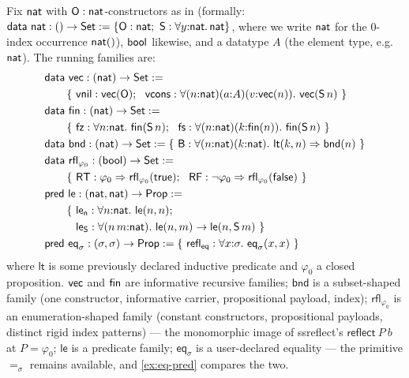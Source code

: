\begin{example}
\label{ex:declarations}
Fix $\mathsf{nat}$ with $\mathsf{O} : \mathsf{nat}$-constructors as in \cite{Extraction2026}
(formally: $\mathsf{data}\ \mathsf{nat} : () \to \mathsf{Set} \mathrel{:=} \{\mathsf{O} : \mathsf{nat};\
\mathsf{S} : \forall y{:}\mathsf{nat}.\,\mathsf{nat}\}$, where we write $\mathsf{nat}$ for the
$0$-index occurrence $\mathsf{nat}()$), $\mathsf{bool}$ likewise, and a datatype $A$
(the element type, e.g.\ $\mathsf{nat}$).  The running families are:
\begin{align*}
  &\mathsf{data}\ \vect : (\nat) \to \Set \defeq\\
  &\qquad \{\ \csvnil : \vect(\csO);\ \
    \csvcons : \forall (n{:}\nat)(a{:}A)(v{:}\vect(n)).\ \vect(\csS\,n)
    \ \}\\
  &\mathsf{data}\ \Fin : (\nat) \to \Set \defeq\\
  &\qquad \{\ \wcns{fz} : \forall n{:}\nat.\ \Fin(\csS\,n);\ \
    \wcns{fs} : \forall (n{:}\nat)(k{:}\Fin(n)).\ \Fin(\csS\,n)\ \}\\
  &\mathsf{data}\ \mathsf{bnd} : (\nat) \to \Set \defeq
    \{\ \wcns{B} : \forall (n{:}\nat)(k{:}\nat).\
      \mathsf{lt}(k, n) \Rightarrow \mathsf{bnd}(n)\ \}\\
  &\mathsf{data}\ \mathsf{rfl}_{\varphi_0} : (\bool) \to \Set \defeq\\
  &\qquad \{\ \wcns{RT} : \varphi_0 \Rightarrow
    \mathsf{rfl}_{\varphi_0}(\cstrue);\ \
    \wcns{RF} : \neg\varphi_0 \Rightarrow
    \mathsf{rfl}_{\varphi_0}(\csfalse)\ \}\\
  &\mathsf{pred}\ \mathsf{le} : (\nat, \nat) \to \Prop \defeq\\
  &\qquad \{\ \wcns{le_n} : \forall n{:}\nat.\ \mathsf{le}(n,n);\\
  &\qquad\phantom{\{}\ \wcns{le_S} : \forall (n\,m{:}\nat).\
      \mathsf{le}(n,m) \to \mathsf{le}(n, \csS\,m)\ \}\\
  &\mathsf{pred}\ \mathsf{eq}_\sigma : (\sigma, \sigma) \to \Prop \defeq
    \{\ \wcns{refl}_{\mathsf{eq}} : \forall x{:}\sigma.\
      \mathsf{eq}_\sigma(x,x)\ \}
\end{align*}
where $\mathsf{lt}$ is some previously declared inductive predicate and
$\varphi_0$ a closed proposition.  $\mathsf{vec}$ and $\mathsf{fin}$ are informative
recursive families; $\mathsf{bnd}$ is a subset-shaped family (one
constructor, informative carrier, propositional payload, index);
$\mathsf{rfl}_{\varphi_0}$ is an enumeration-shaped family (constant
constructors, propositional payloads, distinct rigid index patterns) ---
the monomorphic image of ssreflect's $\mathsf{reflect}\ P\ b$ at $P =
\varphi_0$; $\mathsf{le}$ is a predicate family;
$\mathsf{eq}_\sigma$ is a user-declared equality --- the primitive
$=_\sigma$ remains available, and \cref{ex:eq-pred} compares the two.
\end{example}

